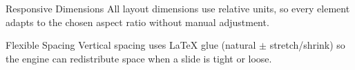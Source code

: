 
\begin{frame}{Responsive Dimensions}
    All layout dimensions use relative units, so every element adapts to the
    chosen aspect ratio without manual adjustment.

    
\end{frame}


\begin{frame}{Flexible Spacing}
    Vertical spacing uses \LaTeX{} glue (natural $\pm$ stretch/shrink) so the
    engine can redistribute space when a slide is tight or loose.

    
\end{frame}
